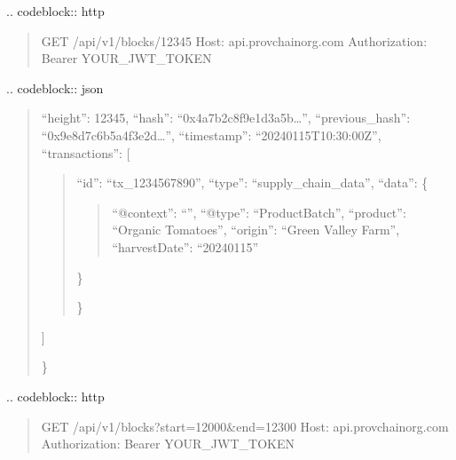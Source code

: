 \documentclass[letterpaper,10pt,english]{sphinxmanual}
\begin{document}
\sphinxAtStartPar
{}
.. code\sphinxhyphen{}block:: http
\begin{quote}

\sphinxAtStartPar
GET /api/v1/blocks/12345
Host: api.provchain\sphinxhyphen{}org.com
Authorization: Bearer YOUR\_JWT\_TOKEN
\end{quote}

\sphinxAtStartPar
{}
.. code\sphinxhyphen{}block:: json
\begin{quote}
\begin{description}
\sphinxlineitem{\{}
\sphinxAtStartPar
“height”: 12345,
“hash”: “0x4a7b2c8f9e1d3a5b…”,
“previous\_hash”: “0x9e8d7c6b5a4f3e2d…”,
“timestamp”: “2024\sphinxhyphen{}01\sphinxhyphen{}15T10:30:00Z”,
“transactions”: {[}
\begin{quote}
\begin{description}
\sphinxlineitem{\{}
\sphinxAtStartPar
“id”: “tx\_1234567890”,
“type”: “supply\_chain\_data”,
“data”: \{
\begin{quote}

\sphinxAtStartPar
“@context”: “”,
“@type”: “ProductBatch”,
“product”: “Organic Tomatoes”,
“origin”: “Green Valley Farm”,
“harvestDate”: “2024\sphinxhyphen{}01\sphinxhyphen{}15”
\end{quote}

\sphinxAtStartPar
\}

\end{description}

\sphinxAtStartPar
\}
\end{quote}

\sphinxAtStartPar
{]}

\end{description}

\sphinxAtStartPar
\}
\end{quote}

\sphinxAtStartPar
{}
.. code\sphinxhyphen{}block:: http
\begin{quote}

\sphinxAtStartPar
GET /api/v1/blocks?start=12000\&end=12300
Host: api.provchain\sphinxhyphen{}org.com
Authorization: Bearer YOUR\_JWT\_TOKEN
\end{quote}
\end{document}
